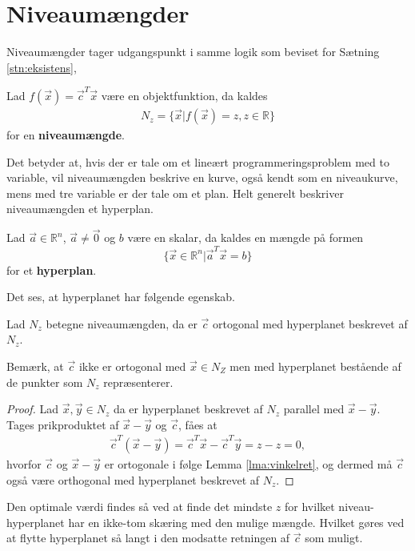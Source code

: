 \section{Niveaumængder}
Niveaumængder tager udgangspunkt i samme logik som beviset for Sætning \ref{stn:eksistens}, 
\begin{defn}[Niveaumængde]
Lad $f(\vec{x})= \vec{c}^T\vec{x}$ være en objektfunktion, da kaldes
\begin{align*}
N_z = \{\vec{x}| f(\vec{x}) = z, z \in \mathds{R}\}
\end{align*}
for en \textbf{niveaumængde}.
\end{defn}
Det betyder at, hvis der er tale om et lineært programmeringsproblem med to variable, vil niveaumængden beskrive en kurve, også kendt som en niveaukurve, mens med tre variable er der tale om et plan. 
Helt generelt beskriver niveaumængden et hyperplan.
\begin{defn}[Hyperplan]
Lad $ \vec{a} \in \mathds{R}^n$, $\vec{a}\neq \vec{0}$ og $b$ være en skalar, da kaldes en mængde på formen
 $$\{ \vec{x} \in \mathds{R}^n | \vec{a}^{T}\vec{x} = b\}$$
for et \textbf{hyperplan}.
\end{defn}
Det ses, at hyperplanet har følgende egenskab.
\begin{stn}
Lad $N_z$ betegne niveaumængden, da er $\vec{c}$ ortogonal med hyperplanet beskrevet af $N_z$.
\end{stn}
Bemærk, at $\vec{c}$ ikke er ortogonal med $\vec{x}\in N_Z$ men med hyperplanet bestående af de punkter som $N_z$ repræsenterer.
\begin{proof}
Lad $\vec{x}, \vec{y} \in N_z$ da er hyperplanet beskrevet af $N_z$ parallel med $\vec{x}-\vec{y}$.
Tages prikproduktet af $\vec{x}-\vec{y}$ og $\vec{c}$, fåes at
\begin{align*}
\vec{c}^T(\vec{x}-\vec{y}) = \vec{c}^T\vec{x} -\vec{c}^T\vec{y} = z - z = 0,
\end{align*}
hvorfor $\vec{c}$ og $\vec{x}-\vec{y}$ er ortogonale i følge Lemma \ref{lma:vinkelret}, og dermed må $\vec{c}$ også være orthogonal med hyperplanet beskrevet af $N_z$.
\end{proof}
Den optimale værdi findes så ved at finde det mindste $z$ for hvilket niveau-hyperplanet har en ikke-tom skæring med den mulige mængde. 
Hvilket gøres ved at flytte hyperplanet så langt i den modsatte retningen af $\vec{c}$ som muligt.
